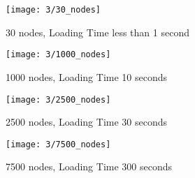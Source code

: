 \documentclass[../dissertation.tex]{subfiles}
\begin{document}
\begin{figure}
\centering
\begin{minipage}{.5\textwidth}
    \texttt{[image: 3/30\_nodes]}
    \caption{30 nodes, Loading Time less than 1 second}
    \label{fig:30nodes}
\end{minipage}%
\begin{minipage}{.5\textwidth}
    \texttt{[image: 3/1000\_nodes]}
    \caption{1000 nodes, Loading Time 10 seconds}
    \label{fig:1000nodes}
\end{minipage}
\end{figure}

\begin{figure}
\centering
\begin{minipage}{.5\textwidth}
    \texttt{[image: 3/2500\_nodes]}
    \vspace*{3.5mm}
    \caption{2500 nodes, Loading Time 30 seconds}
    \label{fig:2500nodes}
\end{minipage}%
\begin{minipage}{.5\textwidth}
    \texttt{[image: 3/7500\_nodes]}
    \caption{7500 nodes, Loading Time 300 seconds}
    \label{fig:7500nodes}
\end{minipage}
\end{figure}
\end{document}
